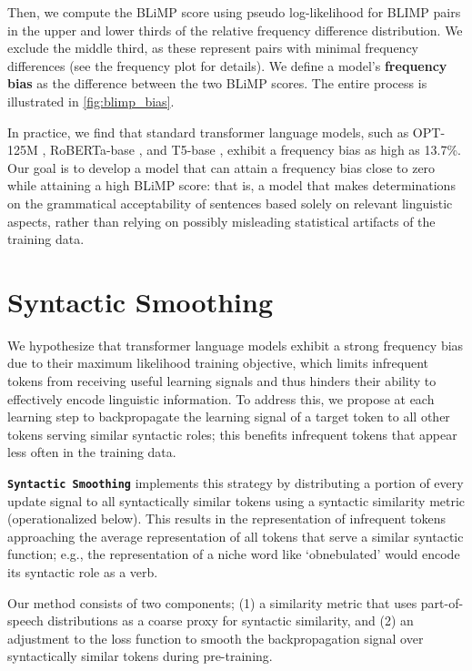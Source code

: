 Then, we compute the BLiMP score using pseudo log-likelihood \citep{salazar2020masked} for BLIMP pairs in the upper and lower thirds of the relative frequency difference distribution. We exclude the middle third, as these represent pairs with minimal frequency differences (see the frequency plot for details). We define a model's \textbf{frequency bias} as the difference between the two BLiMP scores. The entire process is illustrated in \cref{fig:blimp_bias}. 

In practice, we find that standard transformer language models, such as OPT-125M \citep{zhang2022opt}, RoBERTa-base \citep{liu2019roberta}, and T5-base \citep{raffel2020t5}, exhibit a frequency bias as high as 13.7\%. Our goal is to develop a model that can attain a frequency bias close to zero while attaining a high BLiMP score: that is, a model that makes determinations on the grammatical acceptability of sentences based solely on relevant linguistic aspects, rather than relying on possibly misleading statistical artifacts of the training data. 

\section{Syntactic Smoothing}

We hypothesize that transformer language models exhibit a strong frequency bias due to their maximum likelihood training objective, which limits infrequent tokens from receiving useful learning signals and thus hinders their ability to effectively encode linguistic information. To address this, we propose at each learning step to backpropagate the learning signal of a target token to all other tokens serving similar syntactic roles; this benefits infrequent tokens that appear less often in the training data.

\textbf{\texttt{Syntactic Smoothing}} implements this strategy by distributing a portion of every update signal to all syntactically similar tokens using a syntactic similarity metric (operationalized below). This results in the representation of infrequent tokens approaching the average representation of all tokens that serve a similar syntactic function; e.g., the representation of a niche word like `obnebulated' would encode its syntactic role as a verb.

Our method consists of two components; (1) a similarity metric that uses part-of-speech distributions as a coarse proxy for syntactic similarity, and (2) an adjustment to the loss function to smooth the backpropagation signal over syntactically similar tokens during pre-training. 

